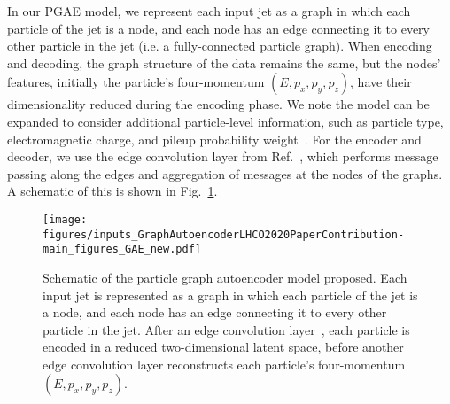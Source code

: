 \documentclass[a4paper,11pt]{article}
\begin{document}
In our PGAE model, we represent each input jet as a graph in which each particle of the jet is a node, and each node has an edge connecting it to every other particle in the jet (i.e. a fully-connected particle graph).
When encoding and decoding, the graph structure of the data remains the same, but the nodes' features, initially the particle's four-momentum $(E, p_x, p_y, p_z)$, have their dimensionality reduced during the encoding phase.
We note the model can be expanded to consider additional particle-level information, such as particle type, electromagnetic charge, and pileup probability weight~\cite{Bertolini:2014bba}.
For the encoder and decoder, we use the edge convolution layer from Ref.~\cite{DGCNN}, which performs message passing along the edges and aggregation of messages at the nodes of the graphs.
A schematic of this is shown in Fig.~\ref{fig:gae}. 


\begin{figure}[htpb]
    \centering
    \texttt{[image: figures/inputs\_GraphAutoencoderLHCO2020PaperContribution-main\_figures\_GAE\_new.pdf]}
    \caption{Schematic of the particle graph autoencoder model proposed. 
    Each input jet is represented as a graph in which each particle of the jet is a node, and each node has an edge connecting it to every other particle in the jet.
    After an edge convolution layer~\cite{DGCNN}, each particle is encoded in a reduced two-dimensional latent space, before another edge convolution layer reconstructs each particle's four-momentum $(E, p_x, p_y, p_z)$.
}
    \label{fig:gae}
\end{figure}
\end{document}
